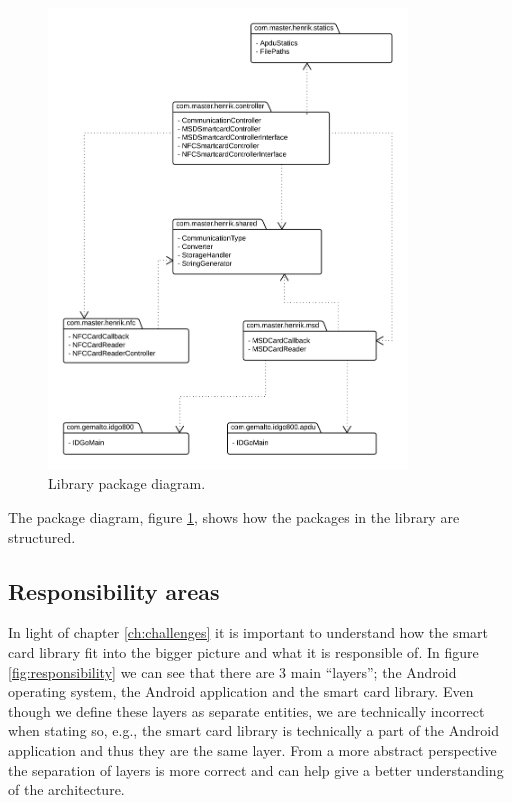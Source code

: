 \begin{figure}[h!]
  \captionsetup{justification=centering,margin=1.5cm}
  \caption{Library package diagram.}
  \label{fig:package}
  \centering
    \includegraphics[width=0.85\textwidth]{images/package2.png}
\end{figure}
The package diagram, figure \ref{fig:package}, shows how  the packages in the library are structured.
\newpage
\subsection{Responsibility areas}
In light of chapter \ref{ch:challenges} it is important to understand how the smart card library fit into the bigger picture and what it is responsible of. In figure \ref{fig:responsibility} we can see that there are 3 main ``layers''; the Android operating system, the Android application and the smart card library. Even though we define these layers as separate entities, we are technically incorrect when stating so, e.g., the smart card library is technically a part of the Android application and thus they are the same layer. From a more abstract perspective the separation of layers is more correct and can help give a better understanding of the architecture.

